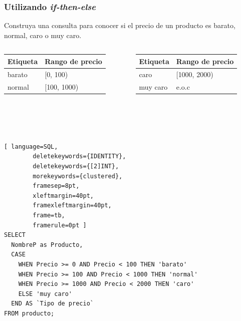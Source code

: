 \documentclass[
	10pt, %
	aspectratio=169, %
]{beamer}
\begin{document}

\begin{frame}[fragile]
	
	\frametitle{Utilizando \emph{if-then-else}}
	
	Construya una consulta para conocer si el precio de un producto es barato, normal, caro o muy caro. 
	
	\begin{columns}[t]
		\begin{table}[]
			\begin{tabular}{|l|l|}
				\hline
				Etiqueta & Rango de precio \\ \hline \hline
				barato   & {[}0, 100)        \\ \hline
				normal   & {[}100, 1000)       \\ \hline
			\end{tabular}
		\end{table}
		
		
		\begin{table}[]
			\begin{tabular}{|l|l|}
				\hline
				Etiqueta   & Rango de precio \\ \hline \hline
				caro          & {[}1000, 2000)        \\ \hline
				muy caro & e.o.c       \\ \hline
			\end{tabular}
		\end{table}
		
	\end{columns}
	
	\pause
	
	\ 
	
	\ 
	
	\begin{lstlisting}[ language=SQL,
		deletekeywords={IDENTITY},
		deletekeywords={[2]INT},
		morekeywords={clustered},
		framesep=8pt,
		xleftmargin=40pt,
		framexleftmargin=40pt,
		frame=tb,
		framerule=0pt ]
SELECT 
  NombreP as Producto, 
  CASE 
    WHEN Precio >= 0 AND Precio < 100 THEN 'barato'
    WHEN Precio >= 100 AND Precio < 1000 THEN 'normal'
    WHEN Precio >= 1000 AND Precio < 2000 THEN 'caro'
    ELSE 'muy caro'
  END AS `Tipo de precio`
FROM producto;
\end{lstlisting}
	
\end{frame}
\end{document}
